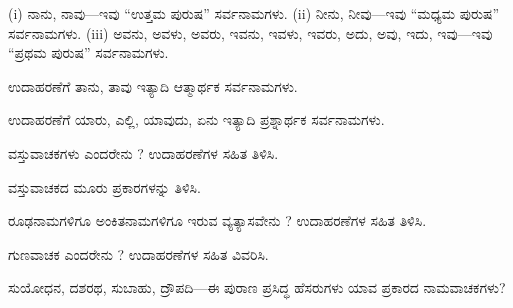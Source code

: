 \indent ({\kbvlatin i}) ನಾನು, ನಾವು—ಇವು “ಉತ್ತಮ ಪುರುಷ” ಸರ್ವನಾಮಗಳು. ({\kbvlatin ii}) ನೀನು, ನೀವು—ಇವು “ಮಧ್ಯಮ ಪುರುಷ” ಸರ್ವನಾಮಗಳು. ({\kbvlatin iii}) ಅವನು, ಅವಳು, ಅವರು, ಇವನು, ಇವಳು, ಇವರು, ಅದು, ಅವು, ಇದು, ಇವು—ಇವು “ಪ್ರಥಮ ಪುರುಷ” ಸರ್ವನಾಮಗಳು.\par

\vspace{4pt plus 4pt minus 1pt}\hspace{0.5em}ಉದಾಹರಣೆಗೆ ತಾನು, ತಾವು ಇತ್ಯಾದಿ ಆತ್ಮಾರ್ಥಕ ಸರ್ವನಾಮಗಳು.\par

\vspace{4pt plus 4pt minus 1pt}\hspace{0.5em}ಉದಾಹರಣೆಗೆ ಯಾರು, ಎಲ್ಲಿ, ಯಾವುದು, ಏನು ಇತ್ಯಾದಿ ಪ್ರಶ್ನಾರ್ಥಕ ಸರ್ವನಾಮಗಳು.\par


\vspace{2.5pt plus 3pt minus 0.5pt}\noindent\hspace*{1.2em}\hspace{0.55em}ವಸ್ತುವಾಚಕಗಳು ಎಂದರೇನು ? ಉದಾಹರಣೆಗಳ ಸಹಿತ ತಿಳಿಸಿ.\par

\vspace{2.5pt plus 3pt minus 0.5pt}\noindent\hspace*{1.2em}\hspace{0.55em}ವಸ್ತುವಾಚಕದ ಮೂರು ಪ್ರಕಾರಗಳನ್ನು ತಿಳಿಸಿ.\par

\vspace{2.5pt plus 3pt minus 0.5pt}\noindent\hspace*{1.2em}\hspace{0.55em}ರೂಢನಾಮಗಳಿಗೂ ಅಂಕಿತನಾಮಗಳಿಗೂ ಇರುವ ವ್ಯತ್ಯಾಸವೇನು ? ಉದಾಹರಣೆಗಳ ಸಹಿತ ತಿಳಿಸಿ.\par

\vspace{2.5pt plus 3pt minus 0.5pt}\noindent\hspace*{1.2em}\hspace{0.55em}ಗುಣವಾಚಕ ಎಂದರೇನು ? ಉದಾಹರಣೆಗಳ ಸಹಿತ ವಿವರಿಸಿ.\par

\vspace{2.5pt plus 3pt minus 0.5pt}\noindent\hspace*{1.2em}\hspace{0.55em}ಸುಯೋಧನ, ದಶರಥ, ಸುಬಾಹು, ದ್ರೌಪದಿ—ಈ ಪುರಾಣ ಪ್ರಸಿದ್ಧ ಹೆಸರುಗಳು ಯಾವ ಪ್ರಕಾರದ ನಾಮವಾಚಕಗಳು?\par

